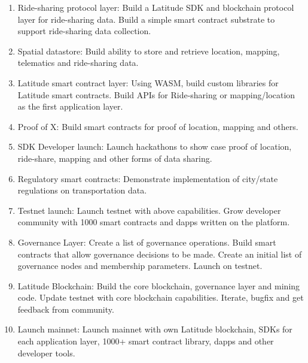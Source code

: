 \begin{enumerate}
    \item Ride-sharing protocol layer: Build a Latitude SDK and blockchain protocol layer for ride-sharing data. Build a
        simple smart contract substrate to support ride-sharing data collection.
    \item Spatial datastore: Build ability to store and retrieve location, mapping, telematics and ride-sharing data.
    \item Latitude smart contract layer: Using WASM, build custom libraries for Latitude smart contracts. Build APIs for
        Ride-sharing or mapping/location as the first application layer.
    \item Proof of X: Build smart contracts for proof of location, mapping and others.
    \item SDK Developer launch: Launch hackathons to show case proof of location, ride-share, mapping and other forms of
        data sharing.
    \item Regulatory smart contracts: Demonstrate implementation of city/state regulations on transportation data.
    \item Testnet launch: Launch testnet with above capabilities. Grow developer community with 1000 smart contracts and
        dapps written on the platform.
    \item Governance Layer: Create a list of governance operations. Build smart contracts that allow governance
        decisions to be made. Create an initial list of governance nodes and membership parameters. Launch on testnet.
    \item Latitude Blockchain: Build the core blockchain, governance layer and mining code. Update testnet with core
        blockchain capabilities. Iterate, bugfix and get feedback from community.
    \item Launch mainnet: Launch mainnet with own Latitude blockchain, SDKs for each application layer, 1000+ smart
        contract library, dapps and other developer tools.
\end{enumerate}

